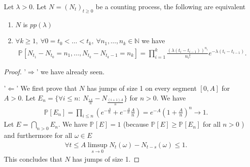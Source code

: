 \begin{theorem}[]
	Let $\lambda> 0$. Let $N=(N_t)_{t\geq 0}$ be a counting process, the following are equivalent
\begin{enumerate}
	\item $N$ is $pp(\lambda)$
	\item $\forall k \geq 1,\ \forall 0=t_0  < \ldots <t_k,\ \forall n_1, \ldots ,n_k \in \mathbb{N}$ we have 
		\begin{align}
		\boxed{\mathbb{P}_{} \left[ N_{t_1}-N_{t_0}=n_1, \ldots ,N_{t_k}-N_{t_k-1}=n_k \right] = \prod_{i=1}^k \frac{(\lambda (t_i - t_{i-1}))^{n_i}}{n_i!} e^{-\lambda (t_i - t_{i-1})}.} 
		\end{align}
\end{enumerate}
\end{theorem}
\begin{proof}
	'$\Longrightarrow$' we have already seen.

'$\Longleftarrow$' We first prove that $N$ has jumps of size 1 on every segment $[0,A]$ for $A>0$. Let $E_n = \{ \forall i \leq n:\ N_{\frac{iA}{n}} - N_{\frac{(i+1)A}{n}} \}$ for $n> 0$. We have 
\begin{align}
	\mathbb{P}_{} \left[ E_n \right] = \prod_{i\leq n}(e^{-\frac{A}{n}} + e^{-\frac{A}{n}}\frac{A}{n}) = e^{-A}(1+\frac{A}{n})^{n} \to 1.
\end{align}
Let $E = \bigcap_{n> 0}E_n$. We have $\mathbb{P}_{} \left[ E \right]  =1$ (because $\mathbb{P}_{} \left[ E \right]  \geq \mathbb{P}_{} \left[ E_n \right] $ for all $n> 0$ ) and furthermore for all $\omega \in E$ 
\begin{align}
	\forall t \leq A \limsup_{s \to 0} N_t(\omega) - N_{t-s}(\omega) \leq 1.
\end{align}
This concludes that $N$ has jumps of size 1.


\end{proof}
